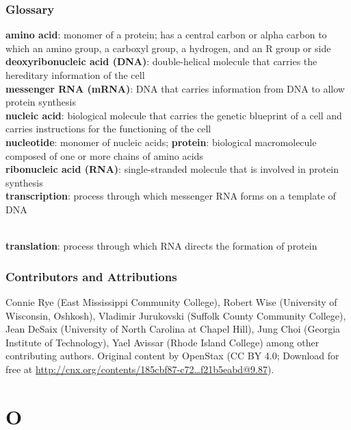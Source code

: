 \documentclass[
]{book}
\begin{document}
\hypertarget{glossary}{%
\subsection{Glossary}\label{glossary}}

\textbf{amino acid}: monomer of a protein; has a central carbon or alpha
carbon to which an amino group, a carboxyl group, a hydrogen, and an R
group or side \textbf{deoxyribonucleic acid (DNA)}: double-helical molecule
that carries the hereditary information of the cell\\
\textbf{messenger RNA (mRNA)}: DNA that carries information from DNA to allow
protein synthesis\\
\textbf{nucleic acid}: biological molecule that carries the genetic blueprint
of a cell and carries instructions for the functioning of the cell\\
\textbf{nucleotide}: monomer of nucleic acids; \textbf{protein}: biological
macromolecule composed of one or more chains of amino acids\\
\textbf{ribonucleic acid (RNA)}: single-stranded
molecule that is involved in protein synthesis\\

\textbf{transcription}: process through which messenger RNA forms on a
template of DNA\\
\strut \\
\textbf{translation}: process through which RNA directs the formation of
protein

\hypertarget{contributors-and-attributions}{%
\subsection{Contributors and Attributions}\label{contributors-and-attributions}}

Connie Rye (East Mississippi Community College), Robert Wise (University
of Wisconsin, Oshkosh), Vladimir Jurukovski (Suffolk County Community
College), Jean DeSaix (University of North Carolina at Chapel Hill),
Jung Choi (Georgia Institute of Technology), Yael Avissar (Rhode Island
College) among other contributing authors. Original content by OpenStax
(CC BY 4.0; Download for free at
\href{http://cnx.org/contents/185cbf87-c72e-48f5-b51e-f14f21b5eabd\%409.87}{http://cnx.org/contents/185cbf87-c72\ldots f21b5eabd@9.87}).

\hypertarget{o}{%
\chapter{O}\label{o}}
\end{document}
